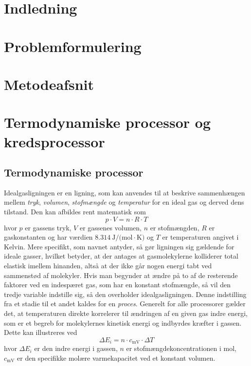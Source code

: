 \documentclass[12pt,a4paper]{article}
\author{Christian Kaae Larsen}
\begin{document}
	\tableofcontents
	\section{Indledning}
	\section{Problemformulering}
	\section{Metodeafsnit} %
	\section{Termodynamiske processor og kredsprocessor}
		\subsection{Termodynamiske processor}
			Idealgasligningen er en ligning, som kan anvendes til at beskrive sammenhængen mellem
			\textit{tryk}, \textit{volumen}, \textit{stofmængde} og \textit{temperatur} for en ideal 
			gas og derved dens tilstand. Den kan afbildes rent matematisk som
			\begin{equation}
				p \cdot V = n \cdot R \cdot T
				\label{eq:idealgasligningen}
			\end{equation}
			hvor \(p\) er gassens tryk, \(V\) er gassenes volumen, \(n\) er stofmængden, \(R\) er gaskonstanten
			og har værdien \(\SI{8.314}{\joule\per (\mole\cdot\kelvin)} \) og \(T\) er temperaturen angivet i 
			Kelvin. Mere specifikt, som navnet antyder, så gør ligningen sig 
			gældende for ideale gasser, hvilket betyder, at der antages at gasmolekylerne kolliderer 
			total elastisk imellem hinanden, altså at der ikke går nogen energi tabt ved sammenstød af 
			molekyler. Hvis man begynder at ændre på to af de resterende faktorer ved en indespæret gas, 
			som har en konstant stofmængde, så vil den tredje variable indstille sig, så den overholder
			idealgasligningen. Denne indstilling fra et stadie til et andet kaldes for en \textit{proces}. 
			Generelt for alle processorer gælder det, at temperaturen direkte korrelerer til ændringen af 
			en given gas indre energi, som er et begreb for molekylernes kinetisk energi og indbyrdes 
			kræfter i gassen. Dette kan illustreres ved
			\begin{equation}
				\Delta E_i = n \cdot c_{\text{mV}} \cdot \Delta T
				\label{eq:2}
			\end{equation}
			hvor \(\Delta E_i\) er den indre energi i gassen, \(n\) er stofmængdekoncentrationen i mol, 
			\(c_{\text{mV}}\) er den specifikke molære varmekapacitet ved et konstant volumen. 
			
\end{document}

